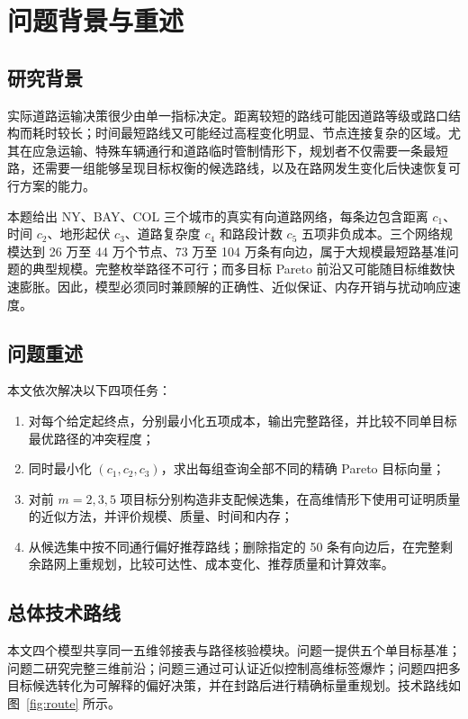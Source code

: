 \documentclass[UTF8,a4paper]{ctexart}
\begin{document}
\section{问题背景与重述}

\subsection{研究背景}

实际道路运输决策很少由单一指标决定。距离较短的路线可能因道路等级或路口结构而耗时较长；时间最短路线又可能经过高程变化明显、节点连接复杂的区域。尤其在应急运输、特殊车辆通行和道路临时管制情形下，规划者不仅需要一条最短路，还需要一组能够呈现目标权衡的候选路线，以及在路网发生变化后快速恢复可行方案的能力。

本题给出 NY、BAY、COL 三个城市的真实有向道路网络，每条边包含距离 $c_1$、时间 $c_2$、地形起伏 $c_3$、道路复杂度 $c_4$ 和路段计数 $c_5$ 五项非负成本。三个网络规模达到 26 万至 44 万个节点、73 万至 104 万条有向边，属于大规模最短路基准问题的典型规模\cite{dimacs}。完整枚举路径不可行；而多目标 Pareto 前沿又可能随目标维数快速膨胀。因此，模型必须同时兼顾解的正确性、近似保证、内存开销与扰动响应速度。

\subsection{问题重述}

本文依次解决以下四项任务：

\begin{enumerate}
  \item 对每个给定起终点，分别最小化五项成本，输出完整路径，并比较不同单目标最优路径的冲突程度；
  \item 同时最小化 $(c_1,c_2,c_3)$，求出每组查询全部不同的精确 Pareto 目标向量；
  \item 对前 $m=2,3,5$ 项目标分别构造非支配候选集，在高维情形下使用可证明质量的近似方法，并评价规模、质量、时间和内存；
  \item 从候选集中按不同通行偏好推荐路线；删除指定的 50 条有向边后，在完整剩余路网上重规划，比较可达性、成本变化、推荐质量和计算效率。
\end{enumerate}

\subsection{总体技术路线}

本文四个模型共享同一五维邻接表与路径核验模块。问题一提供五个单目标基准；问题二研究完整三维前沿；问题三通过可认证近似控制高维标签爆炸；问题四把多目标候选转化为可解释的偏好决策，并在封路后进行精确标量重规划。技术路线如图~\ref{fig:route} 所示。
\end{document}
